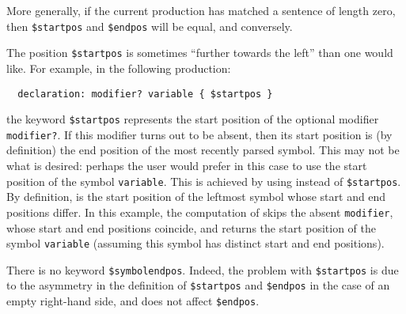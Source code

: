 \documentclass[onecolumn,11pt,nocopyrightspace,preprint]{sigplanconf}
\begin{document}
More generally, if the current production has matched a sentence of length
zero, then \verb+$startpos+ and \verb+$endpos+ will be equal, and conversely.

The position \verb+$startpos+ is sometimes ``further towards the left'' than
one would like. For example, in the following production:
\begin{verbatim}
  declaration: modifier? variable { $startpos }
\end{verbatim}
the keyword \verb+$startpos+ represents the start position of the optional
modifier \verb+modifier?+. If this modifier turns out to be absent, then its
start position is (by definition) the end position of the most recently parsed
symbol. This may not be what is desired: perhaps the user would prefer in this
case to use the start position of the symbol \verb+variable+. This is achieved by
using \ksymbolstartpos instead of \verb+$startpos+. By definition,
\ksymbolstartpos is the start position of the leftmost symbol whose
start and end positions differ. In this example, the computation of
\ksymbolstartpos skips the absent \verb+modifier+, whose start and end
positions coincide, and returns the start position of the symbol \verb+variable+
(assuming this symbol has distinct start and end positions).


There is no keyword \verb+$symbolendpos+. Indeed, the problem
with \verb+$startpos+ is due to the asymmetry in the definition
of \verb+$startpos+ and \verb+$endpos+ in the case of an empty right-hand
side, and does not affect \verb+$endpos+.

\newcommand{\fineprint}{\footnote{%
    The computation of \ksymbolstartpos
    is optimized by \menhir under two assumptions about the lexer. First,
    \menhir assumes that the lexer never produces a token whose start and end
    positions are equal. Second, \menhir assumes that two positions produced
    by the lexer are equal if and only if they are physically equal. If the
    lexer violates either of these assumptions, the computation of
    \ksymbolstartpos could produce a result that differs from
    \texttt{Parsing.symbol\_start\_pos()}.
}}
\end{document}

